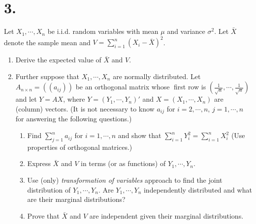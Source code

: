 \documentclass[a4paper, 11pt]{article}
\begin{document}
\section*{3.} Let $X_1,\cdots,X_n$ be i.i.d. random variables with mean $\mu$ and variance $\sigma^2$.  Let $\bar{X}$ denote the sample mean and $V=\sum_{i=1}^{n}\left(X_i-\bar{X}\right)^2$.

\begin{enumerate}[label=(\alph*)]
\item  Derive the expected value of $\bar{X}$ and $V$.
\item  Further suppose that $X_1,\cdots,X_n$ are normally distributed. Let $A_{n\times n} = ((a_{ij}))$
be an orthogonal matrix whose first row is $(\frac{1}{\sqrt{n}},\cdots,\frac{1}{\sqrt{n}})$ and let $Y = AX$, where
$Y = (Y_1,\cdots, Y_n)'$ and $X = (X_1,\cdots,X_n)$ are (column) vectors. (It is not necessary to
know $a_{ij}$ for $i = 2,\cdots, n$, $j = 1,\cdots, n$ for answering the following questions.)

\begin{enumerate}[label=(\roman*)]
	\item  Find $\sum_{j=1}^n a_{ij}$ for $i=1,\cdots,n$ and show that
 $\sum_{i=1}^n Y_i^2 = \sum_{i=1}^nX_i^2$ (Use properties
of orthogonal matrices.)
\item Express $\bar{X}$ and $V$ in terms (or as functions) of  $Y_1,\cdots,Y_n$.
\item Use (only) \textit{transformation of variables} approach to find the joint distribution of
$Y_1,\cdots,Y_n$. Are $Y_1,\cdots,Y_n$ independently distributed and what are their marginal distributions?
\item Prove that $\bar{X}$ and $V$ are independent given their marginal distributions.
 \end{enumerate}

\end{enumerate}
\end{document}
